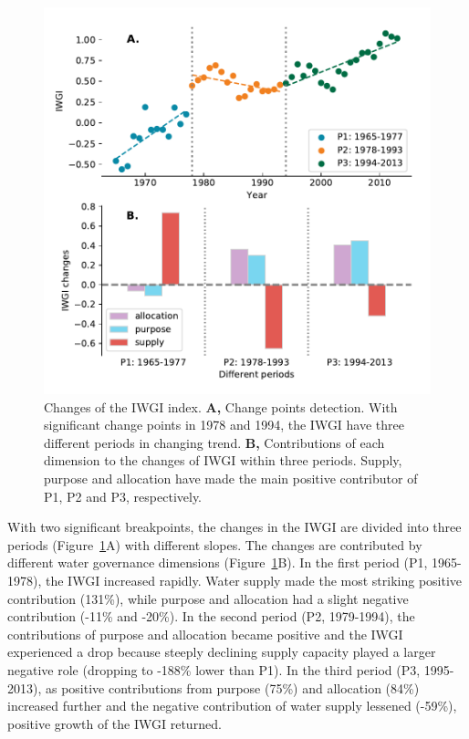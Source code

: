 \documentclass[9pt, twocolumn, twoside, lineno]{pnas-new}
\begin{document}
\begin{figure}[ht!]
	\centering
	\includegraphics[width=\linewidth]{../../figures/main/index.pdf}
	\caption{Changes of the IWGI index. 
	\textbf{A,} Change points detection. With significant change points in 1978 and 1994, the IWGI have three different periods in changing trend.
	\textbf{B,} Contributions of each dimension to the changes of IWGI within three periods. Supply, purpose and allocation have made the main positive contributor of P1, P2 and P3, respectively.
	}
	\label{fig:IWGI}
\end{figure}

With two significant breakpoints, the changes in the IWGI are divided into three periods (Figure~\ref{fig:IWGI}A) with different slopes. 
The changes are contributed by different water governance dimensions (Figure~\ref{fig:IWGI}B).
In the first period (P1, 1965-1978), the IWGI increased rapidly. 
Water supply made the most striking positive contribution (131\%), while purpose and allocation had a slight negative contribution (-11\% and -20\%).
In the second period (P2, 1979-1994), the contributions of purpose and allocation became positive and the IWGI experienced a drop because steeply declining supply capacity played a larger negative role (dropping to -188\% lower than P1). 
In the third period (P3, 1995-2013), as positive contributions from purpose (75\%) and allocation (84\%) increased further and the negative contribution of water supply lessened (-59\%), positive growth of the IWGI returned.
\end{document}
